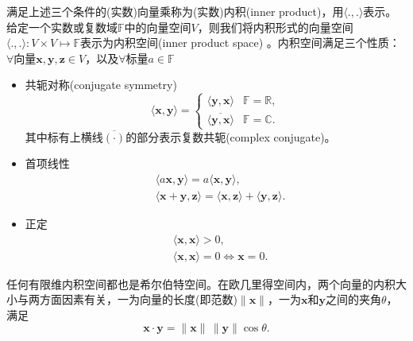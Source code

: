 \begin{definition}[内积空间]
\label{definition:inner-product-space}
满足上述三个条件的(实数)向量乘称为(实数)内积(inner product)，用$\langle .,. \rangle$表示。给定一个实数或复数域$\mathbb{F}$中的向量空间$V$，则我们将内积形式的向量空间$\langle .,.\rangle : V \times V \mapsto \mathbb{F}$表示为内积空间(inner product space) 。内积空间满足三个性质：$\forall \text{向量} \bm{x},\bm{y},\bm{z} \in V$，以及$\forall \text{标量} a \in \mathbb{F}$
\begin{itemize}
  \item 共轭对称(conjugate symmetry)
  \begin{equation*}
    \langle \bm{x} , \bm{y}\rangle =
    \begin{cases}
      \langle \bm{y}, \bm{x} \rangle & \mathbb{F}=\mathbb{R}, \\
      \overline{\langle \bm{y}, \bm{x} \rangle} & \mathbb{F}=\mathbb{C}.
    \end{cases}
  \end{equation*}
  其中标有上横线$\overline{(\cdot)}$的部分表示复数共轭(complex conjugate)。
  \item 首项线性
  \begin{equation*}
  \begin{split}
    &\langle a \bm{x}, \bm{y} \rangle = a \langle \bm{x}, \bm{y} \rangle, \\
    & \langle \bm{x} + \bm{y}, \bm{z} \rangle = \langle \bm{x}, \bm{z} \rangle + \langle \bm{y}, \bm{z} \rangle.
  \end{split}
  \end{equation*}
  \item 正定
  \begin{equation*}
    \begin{split}
      &\langle \bm{x}, \bm{x} \rangle > 0, \\
      &\langle \bm{x}, \bm{x} \rangle = 0 \Leftrightarrow \bm{x} = 0.
    \end{split}
  \end{equation*}
\end{itemize}
\end{definition}

任何有限维内积空间都也是希尔伯特空间。在欧几里得空间内，两个向量的内积大小与两方面因素有关，一为向量的长度(即范数)$\| \bm{x} \|$，一为$\bm{x}$和$\bm{y}$之间的夹角$\theta$，满足
\begin{equation*}
  \bm{x} \cdot \bm{y} = \|\bm{x}\| \, \|\bm{y}\| \cos \theta.
\end{equation*}

